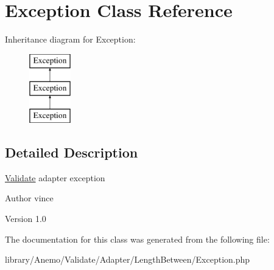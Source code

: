 \hypertarget{class_anemo_1_1_validate_1_1_adapter_1_1_length_between_1_1_exception}{
\section{Exception Class Reference}
\label{class_anemo_1_1_validate_1_1_adapter_1_1_length_between_1_1_exception}
}
Inheritance diagram for Exception:\begin{figure}[H]
\begin{center}
\leavevmode
\includegraphics[height=3.000000cm]{class_anemo_1_1_validate_1_1_adapter_1_1_length_between_1_1_exception}
\end{center}
\end{figure}


\subsection{Detailed Description}
\hyperlink{class_anemo_1_1_validate}{Validate} adapter exception \begin{DoxyAuthor}{Author}
vince 
\end{DoxyAuthor}
\begin{DoxyVersion}{Version}
1.0 
\end{DoxyVersion}


The documentation for this class was generated from the following file:\begin{DoxyCompactItemize}
\item 
library/Anemo/Validate/Adapter/LengthBetween/Exception.php\end{DoxyCompactItemize}

